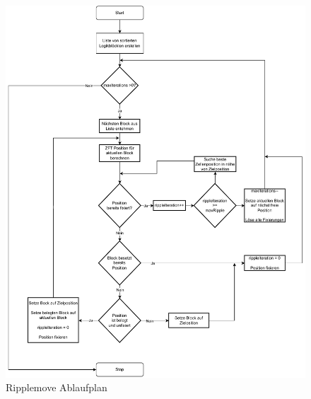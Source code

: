         \begin{figure}[H]
            \centering
            \includegraphics[width=\textwidth]{img/flowchart.pdf}
            \caption{Ripplemove Ablaufplan}
            \label{fig:algo-flowchart}
        \end{figure}
